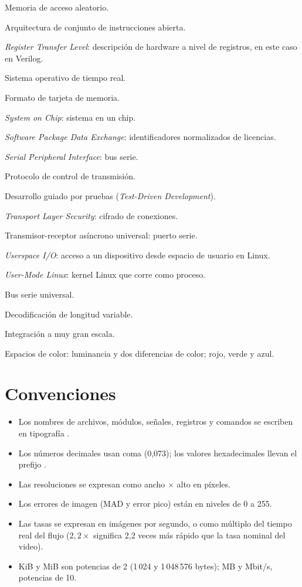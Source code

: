 \begin{description}[style=sameline, leftmargin=8.5em, labelwidth=8em, itemsep=1pt]
  \item[RAM] Memoria de acceso aleatorio.
  \item[RISC-V] Arquitectura de conjunto de instrucciones abierta.
  \item[RTL] \emph{Register Transfer Level}: descripción de hardware a nivel
    de registros, en este caso en Verilog.
  \item[RTOS] Sistema operativo de tiempo real.
  \item[SD, microSD] Formato de tarjeta de memoria.
  \item[SoC] \emph{System on Chip}: sistema en un chip.
  \item[SPDX] \emph{Software Package Data Exchange}: identificadores
    normalizados de licencias.
  \item[SPI] \emph{Serial Peripheral Interface}: bus serie.
  \item[TCP] Protocolo de control de transmisión.
  \item[TDD] Desarrollo guiado por pruebas (\emph{Test-Driven Development}).
  \item[TLS] \emph{Transport Layer Security}: cifrado de conexiones.
  \item[UART] Transmisor-receptor asíncrono universal: puerto serie.
  \item[UIO] \emph{Userspace I/O}: acceso a un dispositivo desde espacio de
    usuario en Linux.
  \item[UML] \emph{User-Mode Linux}: kernel Linux que corre como proceso.
  \item[USB] Bus serie universal.
  \item[VLD] Decodificación de longitud variable.
  \item[VLSI] Integración a muy gran escala.
  \item[YUV, RGB] Espacios de color: luminancia y dos diferencias de color;
    rojo, verde y azul.
\end{description}

\section*{Convenciones}

\begin{itemize}
  \item Los nombres de archivos, módulos, señales, registros y comandos se
    escriben en tipografía .
  \item Los números decimales usan coma (0,073); los valores hexadecimales
    llevan el prefijo .
  \item Las resoluciones se expresan como ancho $\times$ alto en píxeles.
  \item Los errores de imagen (MAD y error pico) están en niveles de 0 a 255.
  \item Las tasas se expresan en imágenes por segundo, o como múltiplo del
    tiempo real del flujo ($2{,}2\times$ significa 2,2 veces más rápido que
    la tasa nominal del video).
  \item KiB y MiB son potencias de 2 (1\,024 y 1\,048\,576 bytes); MB y
    Mbit/s, potencias de 10.
\end{itemize}
